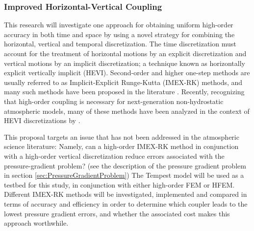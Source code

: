 \documentclass[11pt]{article}
\begin{document}

\subsubsection{Improved Horizontal-Vertical Coupling} \label{sec:CouplingHFEM}

This research will investigate one approach for obtaining uniform high-order accuracy in both time and space by using a novel strategy for combining the horizontal, vertical and temporal discretization.  The time discretization must account for the treatment of horizontal motions by an explicit discretization and vertical motions by an implicit discretization; a technique known as horizontally explicit vertically implicit (HEVI).  Second-order and higher one-step methods are usually referred to as Implicit-Explicit Runge-Kutta (IMEX-RK) methods, and many such methods have been proposed in the literature \citep{UASJRRJS1997AMM, CACMHK2003ANM}.  Recently, recognizing that high-order coupling is necessary for next-generation non-hydrostatic atmospheric models, many of these methods have been analyzed in the context of HEVI discretizations by \cite{HWSJLNW2013JCP}.

This proposal targets an issue that has not been addressed in the atmospheric science literature:  Namely, can a high-order IMEX-RK method in conjunction with a high-order vertical discretization reduce errors associated with the pressure-gradient problem? (see the description of the pressure gradient problem in section \ref{sec:PressureGradientProblem})  The Tempest model will be used as a testbed for this study, in conjunction with either high-order FEM or HFEM.  Different IMEX-RK methods will be investigated, implemented and compared in terms of accuracy and efficiency in order to determine which coupler leads to the lowest pressure gradient errors, and whether the associated cost makes this approach worthwhile.
\end{document}

